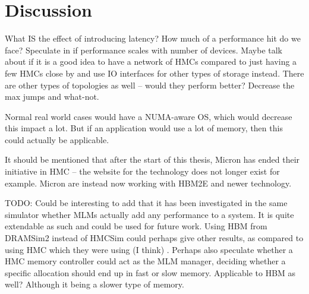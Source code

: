 \chapter{Discussion}
What IS the effect of introducing latency? How much of a performance hit do we face? Speculate in if performance scales with number of devices. Maybe talk about if it is a good idea to have a network of HMCs compared to just having a few HMCs close by and use IO interfaces for other types of storage instead. There are other types of topologies as well -- would they perform better? Decrease the max jumps and what-not.

Normal real world cases would have a NUMA-aware OS, which would decrease this impact a lot. But if an application would use a lot of memory, then this could actually be applicable. 

It should be mentioned that after the start of this thesis, Micron has ended their initiative in HMC -- the website for the technology does not longer exist for example. Micron are instead now working with HBM2E and newer technology. 

TODO: Could be interesting to add that it has been investigated in the same simulator whether MLMs actually add any performance to a system. It is quite extendable as such and could be used for future work. Using HBM from DRAMSim2 instead of HMCSim could perhaps give other results, as compared to using HMC which they were using (I think) \cite{Awad:2017:PAU:3132402.3132422}. Perhaps also speculate whether a HMC memory controller could act as the MLM manager, deciding whether a specific allocation should end up in fast or slow memory. Applicable to HBM as well? Although it being a slower type of memory.